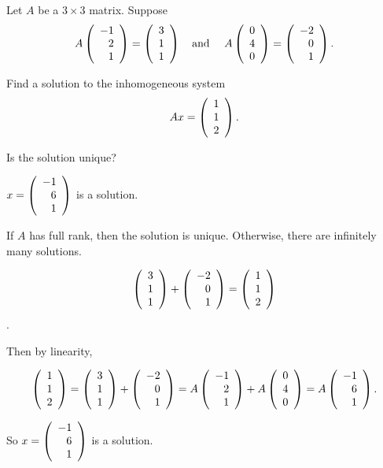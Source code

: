 \documentclass{ximera}
\begin{document}
\begin{exercise} \label{YZ_3.4.3}
Let $A$ be a $3\times 3$ matrix.  Suppose 
\[
A\Matrix{-1\\2\\1}=\Matrix{3\\1\\1} \textup{\quad and \quad} A\Matrix{0\\4\\0}=\Matrix{-2\\0\\1}.
\]

\begin{enumeratea}
\item Find a solution to the inhomogeneous system 
\[
Ax=\Matrix{1 \\ 1 \\2}.
\]
\item Is the solution unique?
\end{enumeratea}


\begin{solution}
\ans 

\begin{enumeratea}
\item $x=\Matrix{-1 \\ 6 \\ 1}$ is a solution. 

\item If $A$ has full rank, then the solution is unique. Otherwise, there are infinitely many solutions.
\end{enumeratea}




\soln 
\begin{enumeratea}
\item  {} 
\[
\Matrix{3 \\ 1\\ 1}+ \Matrix{-2 \\ 0 \\ 1}=\Matrix{1 \\ 1 \\ 2}
\].

Then by linearity, 

\[
\Matrix{1 \\ 1\\ 2}=\Matrix{3 \\ 1\\ 1}+ \Matrix{-2 \\ 0 \\ 1}=A\Matrix{-1 \\ 2\\ 1}+A\Matrix{0 \\ 4 \\ 0}=A\Matrix{-1 \\ 6 \\ 1}.
\] 

So $x=\Matrix{-1 \\ 6 \\ 1}$ is a solution.
\end{enumeratea}

\end{solution}
\end{exercise}
\end{document}
